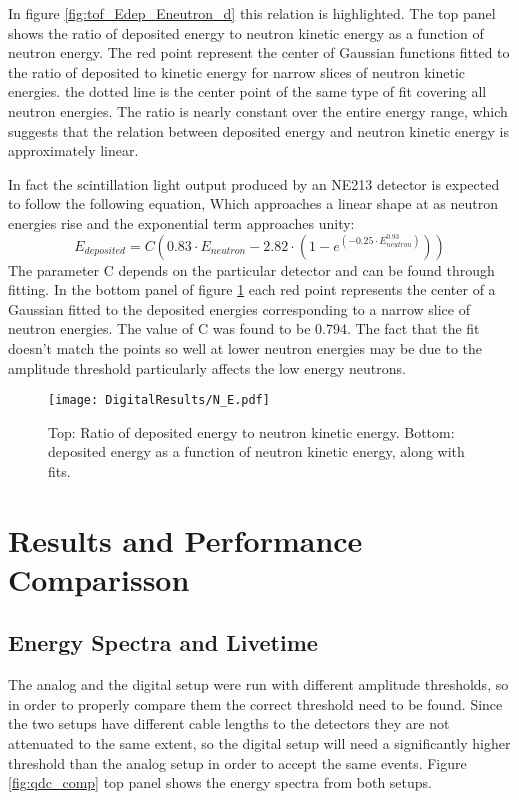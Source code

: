 \documentclass[main.tex]{subfiles}
\begin{document}
In figure \ref{fig:tof_Edep_Eneutron_d} this relation is highlighted. The top panel shows the ratio of deposited energy to neutron kinetic energy as a function of neutron energy. The red point represent the center of Gaussian functions fitted to the ratio of deposited to kinetic energy for narrow slices of neutron kinetic energies. the dotted line is the center point of the same type of fit covering all neutron energies. The ratio is nearly constant over the entire energy range, which suggests that the relation between deposited energy and neutron kinetic energy is approximately linear.

In fact the scintillation light output produced by an NE213 detector is expected to follow the following equation\cite{Scherzinger:2016}, Which approaches a linear shape at as neutron energies rise and the exponential term approaches unity:
\begin{equation}
	E_{deposited} = C\left(  0.83\cdot E_{neutron} - 2.82\cdot\left(  1 - e^{(-0.25\cdot E_{neutron}^{0.93})}  \right)  \right)
\end{equation}
The parameter C depends on the particular detector and can be found through fitting. In the bottom panel of figure \ref{fig:N_E} each red point represents the center of a Gaussian fitted to the deposited energies corresponding to a narrow slice of neutron energies. The value of C was found to be 0.794. The fact that the fit doesn't match the points so well at lower neutron energies may be due to the amplitude threshold particularly affects the low energy neutrons.

\begin{figure}[ht]
    \centering
        \texttt{[image: DigitalResults/N\_E.pdf]}
        \caption[Neutron kinetic energy and deposited energy.]{Top: Ratio of deposited energy to neutron kinetic energy. Bottom: deposited energy as a function of neutron kinetic energy, along with fits.}
    \label{fig:N_E} 
\end{figure}

\section{Results and Performance Comparisson}\label{sec:comp}
\subsection{Energy Spectra and Livetime}
The analog and the digital setup were run with different amplitude thresholds, so in order to properly compare them the correct threshold need to be found. Since the two setups have different cable lengths to the detectors they are not attenuated to the same extent, so the digital setup will need a significantly higher threshold than the analog setup in order to accept the same events. Figure \ref{fig:qdc_comp} top panel shows the energy spectra from both setups.
\end{document}
